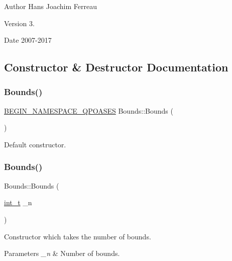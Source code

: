 \begin{DoxyAuthor}{Author}
Hans Joachim Ferreau 
\end{DoxyAuthor}
\begin{DoxyVersion}{Version}
3. 
\end{DoxyVersion}
\begin{DoxyDate}{Date}
2007-\/2017 
\end{DoxyDate}


\subsection{Constructor \& Destructor Documentation}
\mbox{\label{class_bounds_a4df99b6aeade42ade4eaf2d1a14e176a}} 
\subsubsection{\texorpdfstring{Bounds()}{Bounds()}\hspace{0.1cm}{\footnotesize\ttfamily [1/3]}}
{\footnotesize\ttfamily \hyperlink{_types_8hpp_afd127fcb3c8f47975e9fa0ec2bacde52}{B\+E\+G\+I\+N\+\_\+\+N\+A\+M\+E\+S\+P\+A\+C\+E\+\_\+\+Q\+P\+O\+A\+S\+ES} Bounds\+::\+Bounds (\begin{DoxyParamCaption}{ }\end{DoxyParamCaption})}

Default constructor. \mbox{\label{class_bounds_abe2a9220884f74cbe7496075ff6baacb}} 
\subsubsection{\texorpdfstring{Bounds()}{Bounds()}\hspace{0.1cm}{\footnotesize\ttfamily [2/3]}}
{\footnotesize\ttfamily Bounds\+::\+Bounds (\begin{DoxyParamCaption}\item[{\hyperlink{_types_8hpp_ab6fd6105e64ed14a0c9281326f05e623}{int\+\_\+t}}]{\+\_\+n }\end{DoxyParamCaption})}

Constructor which takes the number of bounds. 
\begin{DoxyParams}{Parameters}
{\em \+\_\+n} & Number of bounds. \\
\hline
\end{DoxyParams}
\mbox{\label{class_bounds_acc45b5ad09d22f0aa1f2594bf426f700}} 
